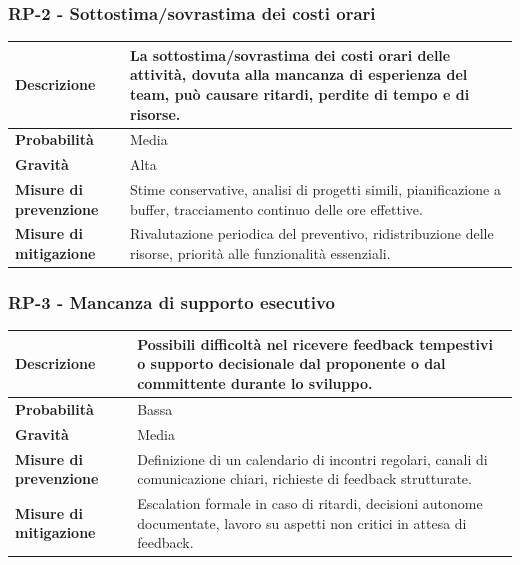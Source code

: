 \documentclass[11pt,a4paper]{article}
\begin{document}
\subsubsection{RP-2 - Sottostima/sovrastima dei costi orari}
\begin{center}
\begin{tabular}{|p{3cm}|p{12cm}|}
    \hline
    \textbf{Descrizione} & La sottostima/sovrastima dei costi orari delle attività, dovuta alla mancanza di esperienza del team, può causare ritardi, perdite di tempo e di risorse. \\
    \hline
    \textbf{Probabilità} & Media \\
    \hline
    \textbf{Gravità} & Alta \\
    \hline
    \textbf{Misure di prevenzione} & Stime conservative, analisi di progetti simili, pianificazione a buffer, tracciamento continuo delle ore effettive. \\
    \hline
    \textbf{Misure di mitigazione} & Rivalutazione periodica del preventivo, ridistribuzione delle risorse, priorità alle funzionalità essenziali. \\
    \hline
\end{tabular}
\end{center}

\subsubsection{RP-3 - Mancanza di supporto esecutivo}
\begin{center}
\begin{tabular}{|p{3cm}|p{12cm}|}
    \hline
    \textbf{Descrizione} & Possibili difficoltà nel ricevere feedback tempestivi o supporto decisionale dal proponente o dal committente durante lo sviluppo. \\
    \hline
    \textbf{Probabilità} & Bassa \\
    \hline
    \textbf{Gravità} & Media \\
    \hline
    \textbf{Misure di prevenzione} & Definizione di un calendario di incontri regolari, canali di comunicazione chiari, richieste di feedback strutturate. \\
    \hline
    \textbf{Misure di mitigazione} & Escalation formale in caso di ritardi, decisioni autonome documentate, lavoro su aspetti non critici in attesa di feedback. \\
    \hline
\end{tabular}
\end{center}
\end{document}
